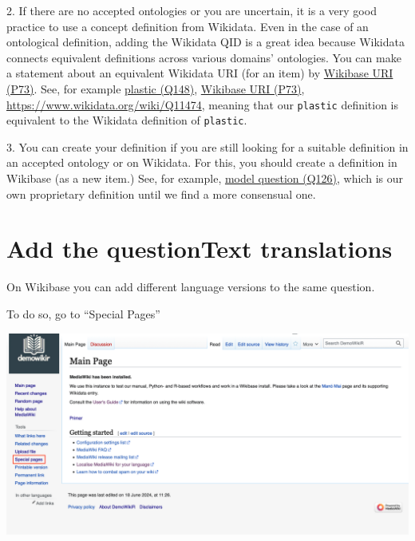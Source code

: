 \documentclass[
  letterpaper,
  DIV=11,
  numbers=noendperiod]{scrreprt}
\begin{document}
2. If there are no accepted ontologies or you are uncertain, it is a
very good practice to use a concept definition from Wikidata. Even in
the case of an ontological definition, adding the Wikidata QID is a
great idea because Wikidata connects equivalent definitions across
various domains' ontologies. You can make a statement about an
equivalent Wikidata URI (for an item) by
\href{https://reprexbase.eu/demowiki/index.php?title=Property:P73}{Wikibase
URI (P73)}. See, for example
\href{https://reprexbase.eu/demowiki/index.php?title=Item:Q148}{plastic
(Q148)},
\href{https://reprexbase.eu/demowiki/index.php?title=Property:P73}{Wikibase
URI (P73)}, \url{https://www.wikidata.org/wiki/Q11474}, meaning that our
\texttt{plastic} definition is equivalent to the Wikidata definition of
\texttt{plastic}.

3. You can create your definition if you are still looking for a
suitable definition in an accepted ontology or on Wikidata. For this,
you should create a definition in Wikibase (as a new item.) See, for
example,
\href{https://reprexbase.eu/demowiki/index.php?title=Item:Q126}{model
question (Q126)}, which is our own proprietary definition until we find
a more consensual one.

\section{Add the questionText
translations}\label{add-the-questiontext-translations}

On Wikibase you can add different language versions to the same
question.

To do so, go to ``Special Pages''

\begin{center}
\includegraphics{png/question_to_wikibase/wikidata_specialPages_2x1.png}
\end{center}
\end{document}
